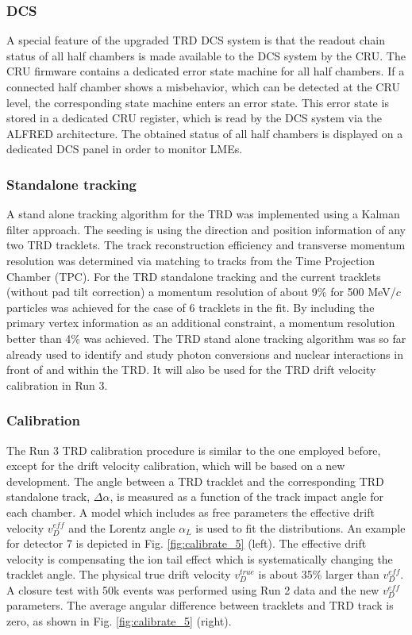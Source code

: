 \subsubsection{DCS}

A special feature of the upgraded TRD DCS system is that the readout chain status of all half chambers is made available to the DCS system by the CRU. The CRU firmware contains a dedicated error state machine for all half chambers. If a connected half chamber shows a misbehavior, which can be detected at the CRU level, the corresponding state machine enters an error state. This error state is stored in a dedicated CRU register, which is read by the DCS system via the ALFRED \cite{Jadlovsky:ICALEPCS2017-THPHA208} architecture. The obtained status of all half chambers is displayed on a dedicated DCS panel in order to monitor LMEs.

\subsubsection{Standalone tracking}
\label{sec:TRD_stand_alone_tracking}
A stand alone tracking algorithm for the TRD was implemented using a Kalman filter approach. The seeding is using the direction and position information of any two TRD tracklets. The track reconstruction efficiency and transverse momentum resolution was determined via matching to tracks from the Time Projection Chamber (TPC).
For the TRD standalone tracking and the current tracklets (without pad tilt correction) a momentum resolution of about 9\% for 500 MeV/$c$ particles was achieved for the case of 6 tracklets in the fit. By including the primary vertex information as an additional constraint, a momentum resolution better than 4\% was achieved. The TRD stand alone tracking algorithm was so far already used to identify and study photon conversions and nuclear interactions in front of and within the TRD. It will also be used for the TRD drift velocity calibration in Run 3.

\subsubsection{Calibration}

The Run 3 TRD calibration procedure is similar to the one employed before, except for the drift velocity calibration, which will be based on a new development. The angle between a TRD tracklet and the corresponding TRD standalone track, $\Delta \alpha$, is measured as a function of the track impact angle for each chamber. 
A model which includes as free parameters the effective drift velocity $v_{D}^{eff}$ and the Lorentz angle $\alpha_{L}$ is used to fit the distributions. An example for detector 7 is depicted in Fig. \ref{fig:calibrate_5} (left). The effective drift velocity is compensating the ion tail effect which is systematically changing the tracklet angle. The physical true drift velocity $v^{true}_{D}$ is about 35\% larger than $v_{D}^{eff}$. A closure test with 50k events was performed using Run 2 data and the new $v_{D}^{eff}$ parameters. The average angular difference between tracklets and TRD track is zero, as shown in Fig. \ref{fig:calibrate_5} (right).

